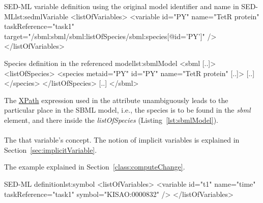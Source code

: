 \begin{myXmlLst}{SED-ML variable definition using the original model identifier and name in SED-ML}{lst:sedmlVariable}
<listOfVariables>
	<variable id="PY" name="TetR protein"  taskReference="task1" 
		target="/sbml:sbml/sbml:listOfSpecies/sbml:species[@id='PY']" />
</listOfVariables>
\end{myXmlLst}

\begin{myXmlLst}{Species definition in the referenced model}{lst:sbmlModel}
<sbml [..]>
	<listOfSpecies>
		<species metaid="PY" id="PY" name="TetR protein" [..]>
		[..]
		</species>
 	</listOfSpecies>
 	[..]
</sbml>
\end{myXmlLst}

The \hyperref[sec:xpath]{XPath} expression used in the  attribute unambiguously leads to the particular place in the SBML model, i.e., the species is to be found in the \emph{sbml} element, and there inside the \emph{listOfSpecies} (Listing~\ref{lst:sbmlModel}). 



\paragraph*{}
\label{sec:symbol}
The   that variable's concept. The notion of implicit variables is explained in Section~\ref{sec:implicitVariable}.  


The example  explained in Section~\ref{class:computeChange}.

\begin{myXmlLst}{SED-ML  definition}{lst:symbol}
<listOfVariables>
	<variable id="t1" name="time" taskReference="task1" symbol="KISAO:0000832" />
</listOfVariables>
\end{myXmlLst}

